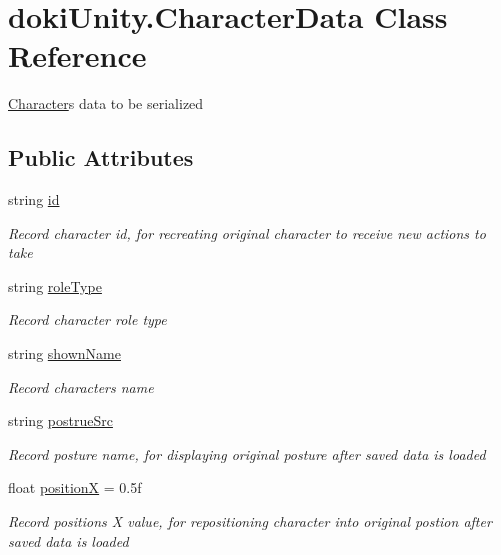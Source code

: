\hypertarget{classdoki_unity_1_1_character_data}{}\section{doki\+Unity.\+Character\+Data Class Reference}
\label{classdoki_unity_1_1_character_data}


\hyperlink{classdoki_unity_1_1_character}{Character}\textquotesingle{}s data to be serialized  


\subsection*{Public Attributes}
\begin{DoxyCompactItemize}
\item 
string \hyperlink{classdoki_unity_1_1_character_data_a696154d979ff8edaf48cf252792ec823}{id}
\begin{DoxyCompactList}\small\item\em Record character id, for recreating original character to receive new actions to take \end{DoxyCompactList}\item 
string \hyperlink{classdoki_unity_1_1_character_data_ae1ad2cd46972669b421f3d6904346272}{role\+Type}
\begin{DoxyCompactList}\small\item\em Record character role type \end{DoxyCompactList}\item 
string \hyperlink{classdoki_unity_1_1_character_data_abbf9ffe3b7f78d95979048a0de3c379a}{shown\+Name}
\begin{DoxyCompactList}\small\item\em Record character\textquotesingle{}s name \end{DoxyCompactList}\item 
string \hyperlink{classdoki_unity_1_1_character_data_a52723e156c7c0698a415fa683a3006ce}{postrue\+Src}
\begin{DoxyCompactList}\small\item\em Record posture name, for displaying original posture after saved data is loaded \end{DoxyCompactList}\item 
float \hyperlink{classdoki_unity_1_1_character_data_ab10c8f050cc28b91ad597c7085c6bf91}{positionX} = 0.\+5f
\begin{DoxyCompactList}\small\item\em Record position\textquotesingle{}s X value, for repositioning character into original postion after saved data is loaded \end{DoxyCompactList}\item 

\end{DoxyCompactItemize}
